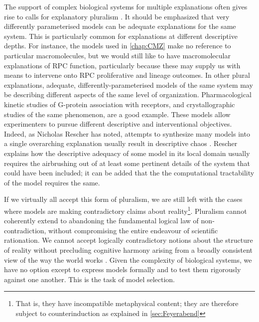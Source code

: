 The support of complex biological systems for multiple explanations often gives rise to calls for explanatory pluralism \cite{Brigandt2010}. It should be emphasized that very differently parameterised models can be adequate explanations for the same system. This is particularly common for explanations at different descriptive depths. For instance, the models used in \autoref{chap:CMZ} make no reference to particular macromolecules, but we would still like to have macromolecular explanations of RPC function, particularly because these may supply us with means to intervene onto RPC proliferative and lineage outcomes. In other plural explanations, adequate, differently-parameterised models of the same system may be describing different aspects of the same level of organization. Pharmacological kinetic studies of G-protein association with receptors, and crystallographic studies of the same phenomenon, are a good example. These models allow experimenters to pursue different descriptive and interventional objectives. Indeed, as Nicholas Rescher has noted, attempts to synthesize many models into a single overarching explanation usually result in descriptive chaos \cite[p.65-6]{Rescher2000}. Rescher explains how the descriptive adequacy of some model in its local domain usually requires the airbrushing out of at least some pertinent details of the system that could have been included; it can be added that the the computational tractability of the model requires the same.

If we virtually all accept this form of pluralism, we are still left with the cases where models are making contradictory claims about reality\footnote{That is, they have incompatible metaphysical content; they are therefore subject to counterinduction as explained in \autoref{sec:Feyerabend}}. Pluralism cannot coherently extend to abandoning the fundamental logical law of non-contradiction, without compromising the entire endeavour of scientific rationation. We cannot accept logically contradictory notions about the structure of reality without precluding cognitive harmony arising from a broadly consistent view of the way the world works \cite{Rescher2005}. Given the complexity of biological systems, we have no option except to express models formally and to test them rigorously against one another. This is the task of model selection.

